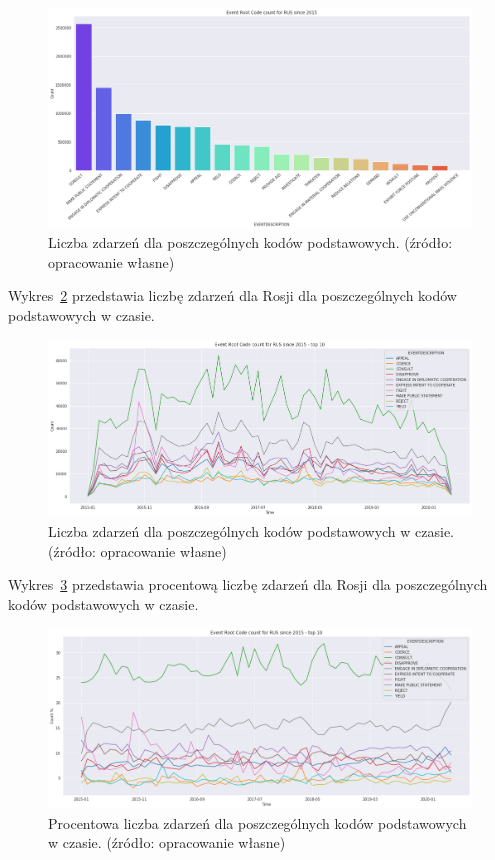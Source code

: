 \documentclass[11pt]{report}
\begin{document}
    \begin{figure}[!htp]
        \centering
        \includegraphics[width=1 \textwidth]{fig/RUS/RUSERC.png}
        \caption{Liczba zdarzeń dla poszczególnych kodów podstawowych. (źródło: opracowanie własne)}
        \label{fig:RUSPERC}
    \end{figure}

    Wykres~\ref{fig:RUSPERCinTIME} przedstawia liczbę zdarzeń dla Rosji dla poszczególnych kodów podstawowych w czasie.
    \begin{figure}[!htp]
        \centering
        \includegraphics[width=1 \textwidth]{fig/RUS/RUSERCinTIME.png}
        \caption{Liczba zdarzeń dla poszczególnych kodów podstawowych w czasie. (źródło: opracowanie własne)}
        \label{fig:RUSPERCinTIME}
    \end{figure}

    Wykres~\ref{fig:RUSPERCpercinTIME} przedstawia procentową liczbę zdarzeń dla Rosji dla poszczególnych kodów podstawowych w czasie.
    \begin{figure}[!htp]
        \centering
        \includegraphics[width=1 \textwidth]{fig/RUS/RUSERCpercinTIME.png}
        \caption{Procentowa liczba zdarzeń dla poszczególnych kodów podstawowych w czasie. (źródło: opracowanie własne)}
        \label{fig:RUSPERCpercinTIME}
    \end{figure}
\end{document}
